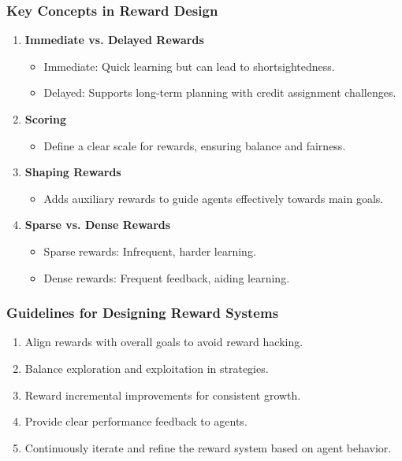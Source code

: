 \documentclass[aspectratio=169]{beamer}
\begin{document}
\begin{frame}[fragile]
    \frametitle{Key Concepts in Reward Design}
    \begin{enumerate}
        \item \textbf{Immediate vs. Delayed Rewards}
        \begin{itemize}
            \item Immediate: Quick learning but can lead to shortsightedness.
            \item Delayed: Supports long-term planning with credit assignment challenges.
        \end{itemize}
        
        \item \textbf{Scoring}
        \begin{itemize}
            \item Define a clear scale for rewards, ensuring balance and fairness.
        \end{itemize}
        
        \item \textbf{Shaping Rewards}
        \begin{itemize}
            \item Adds auxiliary rewards to guide agents effectively towards main goals.
        \end{itemize}
        
        \item \textbf{Sparse vs. Dense Rewards}
        \begin{itemize}
            \item Sparse rewards: Infrequent, harder learning.
            \item Dense rewards: Frequent feedback, aiding learning.
        \end{itemize}
    \end{enumerate}
\end{frame}

\begin{frame}[fragile]
    \frametitle{Guidelines for Designing Reward Systems}
    \begin{enumerate}
        \item Align rewards with overall goals to avoid reward hacking.
        \item Balance exploration and exploitation in strategies.
        \item Reward incremental improvements for consistent growth.
        \item Provide clear performance feedback to agents.
        \item Continuously iterate and refine the reward system based on agent behavior.
    \end{enumerate}
\end{frame}
\end{document}
